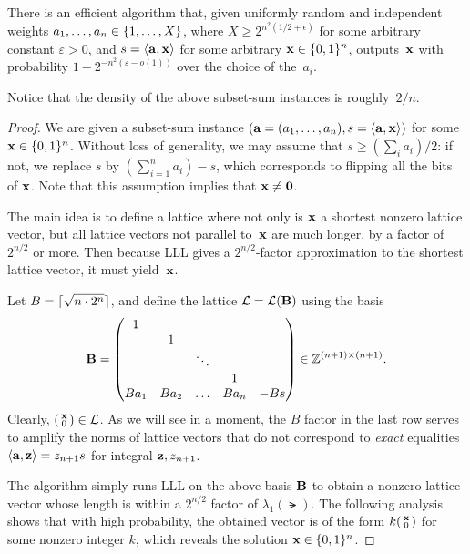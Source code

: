 \documentclass[11pt]{article}
\begin{document}
\begin{theorem}
  There is an efficient algorithm that, given uniformly random and
  independent weights $a_{1},\ldots, a_{n} \in \{1,\ldots, X\}$,
  where $X \geq 2^{n^2(1/2+\epsilon)}$ for some arbitrary constant
  $\varepsilon > 0$, and $s = \langle\mathbf{a},\mathbf{x}\rangle$ for some arbitrary
  $\mathbf{x} \in \{0,1\}^{n}$, outputs~$\mathbf{x}$ with probability
  $1-2^{-n^{2} (\varepsilon - o(1))}$ over the choice of the~$a_{i}$.
\end{theorem}
Notice that the density of the above subset-sum instances is
roughly~$2/n$.

\begin{proof}
  We are given a subset-sum instance
  $(\mathbf{a} = (a_{1}, \ldots, a_{n}), s = \langle\mathbf{a}, \mathbf{x}\rangle)$ for
  some $\mathbf{x} \in \{0,1\}^{n}$. Without loss of generality, we may assume
  that $s \geq (\sum_{i} a_i)/2$: if not, we replace $s$ by
  $(\sum_{i=1}^{n} a_i) - s$, which corresponds to flipping all the
  bits of $\mathbf{x}$. Note that this assumption implies that
  $\mathbf{x} \neq \mathbf{0}$.
    
  The main idea is to define a lattice where not only is $\mathbf{x}$ a
  shortest nonzero lattice vector, but all lattice vectors not
  parallel to~$\mathbf{x}$ are much longer, by a factor of~$2^{n/2}$ or
  more. Then because LLL gives a $2^{n/2}$-factor approximation to the
  shortest lattice vector, it must yield~$\mathbf{x}$.

  Let $B = \lceil\sqrt{n\cdot 2^n}\rceil$, and define the lattice
  $\mathcal{L} = \mathcal{L}(\mathbf{B})$ using the basis
  \[ \mathbf{B} =
    \begin{pmatrix}
      1 & & & & \\
        & 1 & & & \\
        & & \ddots & & \\
        & & & 1 & \\
      B a_1 & B a_2 & \ldots & B a_n & -B s \\
    \end{pmatrix}
    \in \mathbb{Z}^{(n+1)\times (n+1)}. \] Clearly,
  $\left(\begin{smallmatrix}\mathbf{x} \\ 0\end{smallmatrix}\right) \in \mathcal{L}$. As we will see in a moment, the $B$
  factor in the last row serves to amplify the norms of lattice
  vectors that do not correspond to \emph{exact} equalities
  $\langle\mathbf{a},\mathbf{z}\rangle = z_{n+1} s$ for integral $\mathbf{z}, z_{n+1}$.

  The algorithm simply runs LLL on the above basis $\mathbf{B}$ to obtain a
  nonzero lattice vector whose length is within a $2^{n/2}$ factor of
  $\lambda_{1}(\lat)$. The following analysis shows that with high
  probability, the obtained vector is of the form
  $k \smlmat{\vecx \\ 0}$ for some nonzero integer $k$, which reveals
  the solution $\mathbf{x} \in \{0,1\}^{n}$.
  

\end{proof}
\end{document}

